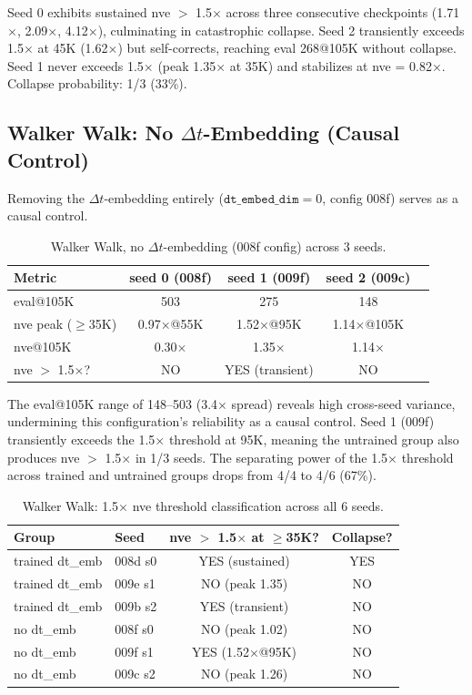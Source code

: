 \documentclass[10pt,letterpaper]{article}
\begin{document}
Seed 0 exhibits sustained nve $>$ 1.5$\times$ across three consecutive checkpoints (1.71$\times$, 2.09$\times$, 4.12$\times$), culminating in catastrophic collapse. Seed 2 transiently exceeds 1.5$\times$ at 45K (1.62$\times$) but self-corrects, reaching eval 268@105K without collapse. Seed 1 never exceeds 1.5$\times$ (peak 1.35$\times$ at 35K) and stabilizes at nve = 0.82$\times$. Collapse probability: 1/3 (33\%).

\subsection{Walker Walk: No $\Delta t$-Embedding (Causal Control)}
\label{sec:walker-notrain}

Removing the $\Delta t$-embedding entirely ($\texttt{dt\_embed\_dim}{=}0$, config 008f) serves as a causal control.

\begin{table}[h]
\centering
\caption{Walker Walk, no $\Delta t$-embedding (008f config) across 3 seeds.}
\label{tab:walker-008f}
\begin{tabular}{lcccc}
\toprule
Metric & seed 0 (008f) & seed 1 (009f) & seed 2 (009c) \\
\midrule
eval@105K & 503 & 275 & 148 \\
nve peak ($\geq$35K) & 0.97$\times$@55K & 1.52$\times$@95K & 1.14$\times$@105K \\
nve@105K & 0.30$\times$ & 1.35$\times$ & 1.14$\times$ \\
nve $>$ 1.5$\times$? & NO & YES (transient) & NO \\
\bottomrule
\end{tabular}
\end{table}

The eval@105K range of 148--503 (3.4$\times$ spread) reveals high cross-seed variance, undermining this configuration's reliability as a causal control. Seed 1 (009f) transiently exceeds the 1.5$\times$ threshold at 95K, meaning the untrained group also produces nve $>$ 1.5$\times$ in 1/3 seeds. The separating power of the 1.5$\times$ threshold across trained and untrained groups drops from 4/4 to 4/6 (67\%).

\begin{table}[h]
\centering
\caption{Walker Walk: 1.5$\times$ nve threshold classification across all 6 seeds.}
\label{tab:walker-threshold}
\begin{tabular}{llcc}
\toprule
Group & Seed & nve $>$ 1.5$\times$ at $\geq$35K? & Collapse? \\
\midrule
trained dt\_emb & 008d s0 & YES (sustained) & YES \\
trained dt\_emb & 009e s1 & NO (peak 1.35) & NO \\
trained dt\_emb & 009b s2 & YES (transient) & NO \\
no dt\_emb & 008f s0 & NO (peak 1.02) & NO \\
no dt\_emb & 009f s1 & YES (1.52$\times$@95K) & NO \\
no dt\_emb & 009c s2 & NO (peak 1.26) & NO \\
\bottomrule
\end{tabular}
\end{table}
\end{document}
